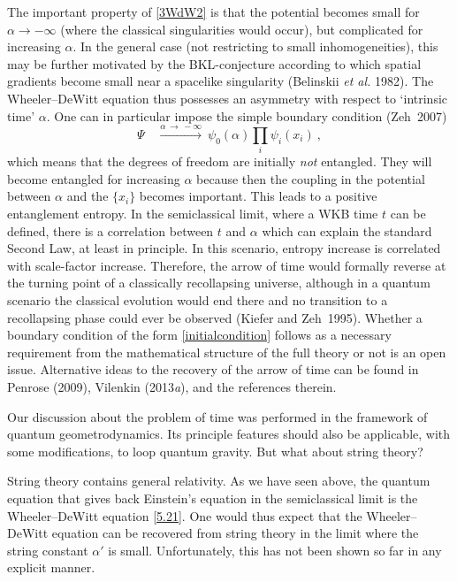 \documentclass[12pt,a4paper]{article}
\newcommand{\lb}{\label}
\begin{document}
The important property of \eqref{3WdW2} is
that the potential becomes small for $\alpha\to -\infty$ (where the
classical singularities would occur), but complicated for increasing
$\alpha$. In the general case (not restricting to small
inhomogeneities), this may be further motivated by the
BKL-conjecture according to which spatial gradients become small
near a spacelike singularity (Belinskii {\em et al.} 1982). 
The Wheeler--DeWitt
equation thus possesses an asymmetry with respect to `intrinsic
time' $\alpha$. 
One can in particular impose the simple boundary
condition (Zeh~2007)
\begin{equation}
\lb{initialcondition}
\Psi \quad \stackrel{\alpha \, \to \, -\infty}{\longrightarrow}\
\psi_0(\alpha)\prod_i \psi_i(x_i)\ ,
\end{equation}
which means that the degrees of freedom are initially {\em not}
entangled. They will become entangled for increasing $\alpha$ because
then the coupling in the potential between $\alpha$ and the $\{ x_i\}$
becomes important. This leads to a positive entanglement entropy. In
the semiclassical limit, where a WKB time $t$ can be defined, there is
a correlation between $t$ and $\alpha$ which can explain the standard
Second Law, at least in principle. In this scenario, entropy increase
is correlated with scale-factor increase. Therefore, the arrow of time
would formally reverse at the turning point of a classically
recollapsing universe, although in a quantum scenario the classical
evolution would end there and no transition to a recollapsing phase
could ever be observed (Kiefer and Zeh~1995). Whether a boundary
condition of the form \eqref{initialcondition} follows as a necessary
requirement from the mathematical structure of the full theory or
not is an open issue.
Alternative ideas to the recovery of the arrow of time can be found in
Penrose (2009), Vilenkin (2013{\em a}), and the references therein. 
 
Our discussion about the problem of time was performed in the
framework of quantum 
geometrodynamics. Its principle features should also be applicable,
with some modifications, to loop quantum gravity. But what about
string theory?

String theory contains general relativity. As we have seen above, the
quantum equation that gives back Einstein's equation in the
semiclassical limit is the Wheeler--DeWitt equation \eqref{5.21}. One
would thus expect that the  Wheeler--DeWitt equation can be recovered
from string theory in the limit where the string constant $\alpha'$ is
small. Unfortunately, this has not been shown so far in any explicit manner.
\end{document}
